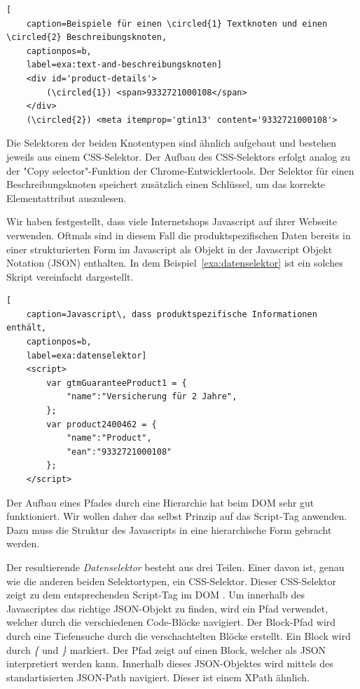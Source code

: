 \begin{lstlisting}[
    caption=Beispiele für einen \circled{1} Textknoten und einen \circled{2} Beschreibungsknoten,
    captionpos=b,
    label=exa:text-and-beschreibungsknoten]
    <div id='product-details'>
        (\circled{1}) <span>9332721000108</span>
    </div>
    (\circled{2}) <meta itemprop='gtin13' content='9332721000108'>
\end{lstlisting}

Die Selektoren der beiden Knotentypen sind ähnlich aufgebaut und bestehen jeweils aus einem CSS-Selektor.
Der Aufbau des CSS-Selektors erfolgt analog zu der "Copy selector"-Funktion der Chrome-Entwicklertools.
Der Selektor für einen Beschreibungsknoten speichert zusätzlich einen Schlüssel, um das korrekte Elementattribut
auszulesen.

Wir haben festgestellt, dass viele Internetshops Javascript auf ihrer Webseite verwenden.
Oftmals sind in diesem Fall die produktspezifischen Daten bereits in einer strukturierten Form im Javascript
als Objekt in der Javascript Objekt Notation (JSON) enthalten.
In dem Beispiel~\ref{exa:datenselektor} ist ein solches Skript vereinfacht dargestellt.

\begin{lstlisting}[
    caption=Javascript\, dass produktspezifische Informationen enthält,
    captionpos=b,
    label=exa:datenselektor]
    <script>
        var gtmGuaranteeProduct1 = {
            "name":"Versicherung für 2 Jahre",
        };
        var product2400462 = {
            "name":"Product",
            "ean":"9332721000108"
        };
    </script>
\end{lstlisting}

Der Aufbau eines Pfades durch eine Hierarchie hat beim DOM sehr gut funktioniert.
Wir wollen daher das selbst Prinzip auf das Script-Tag anwenden.
Dazu muss die Struktur des Javascripts in eine hierarchische Form gebracht werden.

Der resultierende \textit{Datenselektor} besteht aus drei Teilen.
Einer davon ist, genau wie die anderen beiden Selektortypen, ein CSS-Selektor.
Dieser CSS-Selektor zeigt zu dem entsprechenden Script-Tag im DOM .
Um innerhalb des Javascriptes das richtige JSON-Objekt zu finden, wird ein Pfad verwendet, welcher durch die
verschiedenen Code-Blöcke navigiert.
Der Block-Pfad wird durch eine Tiefensuche durch die verschachtelten Blöcke erstellt.
Ein Block wird durch \textit{\{} und \textit{\}} markiert.
Der Pfad zeigt auf einen Block, welcher als JSON interpretiert werden kann.
Innerhalb dieses JSON-Objektes wird mittels des standartisierten JSON-Path navigiert.
Dieser ist einem XPath ähnlich.

